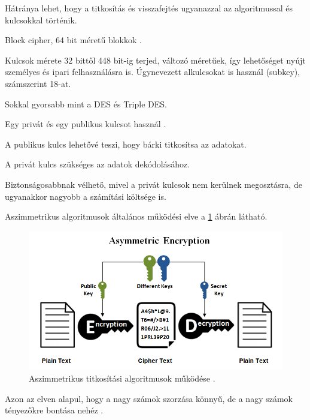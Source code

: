 Hátránya lehet, hogy a titkosítás és visszafejtés ugyanazzal az algoritmussal és kulcsokkal történik.



\noindent Block cipher, 64 bit méretű blokkok \cite{nie2009study}.

Kulcsok mérete 32 bittől 448 bit-ig terjed, változó méretűek, így lehetőséget nyújt személyes és ipari felhasználásra is. Úgynevezett alkulcsokat is használ (subkey), számszerint 18-at.

Sokkal gyorsabb mint a DES és Triple DES.









\noindent Egy privát és egy publikus kulcsot használ \cite{yassein2017comprehensive}.

A publikus kulcs lehetővé teszi, hogy bárki titkosítsa az adatokat.

A privát kulcs szükséges az adatok  dekódolásához. 

Biztonságosabbnak vélhető, mivel a privát kulcsok nem kerülnek megosztásra, de u\-gyan\-ak\-kor nagyobb a számítási költsége is.\newline

Aszimmetrikus algoritmusok általános működési elve a \ref{fig:asym_encryption} ábrán látható.
\begin{figure}[h]
	\centering
	\includegraphics[scale=0.5]{images/asym.png}
	\caption{Aszimmetrikus titkosítási algoritmusok működése \cite{ssl2buywiki}.}
	\label{fig:asym_encryption}
\end{figure}

\noindent Azon az elven alapul, hogy a nagy számok szorzása könnyű, de a nagy számok tényezőkre bontása nehéz \cite{gupta2011ecc}. 

